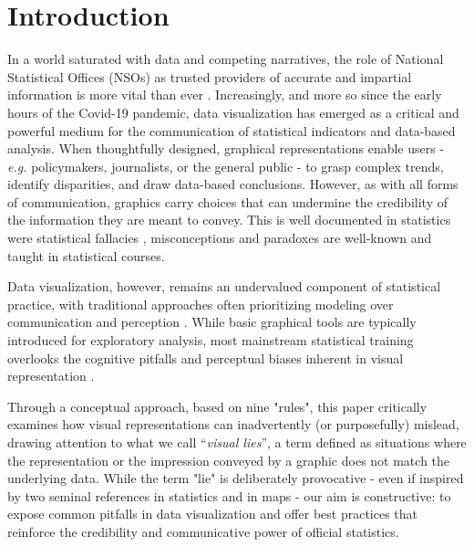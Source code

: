 \documentclass[11pt,twoside,a4paper]{article}
\begin{document}
\section{Introduction}
In a world saturated with data and competing narratives, the role of National Statistical Offices (NSOs) as trusted providers of accurate and impartial information is more vital than ever \citep{Hossein2023-DataGov, Schreyer2024-Intw, Perucci22024-Trust, Pullinger2020-Trust}. Increasingly, and more so since the early hours of the Covid-19 pandemic, data visualization has emerged as a critical and powerful medium for the communication of statistical indicators and data-based analysis. When thoughtfully designed, graphical representations enable users - \emph{ e.g.}  policymakers, journalists, or the general public - to grasp complex trends, identify disparities, and draw data-based conclusions. However, as with all forms of communication, graphics carry choices that can undermine the credibility of the information they are meant to convey. This is well documented in statistics were statistical fallacies \citep{Huff1954}, misconceptions and paradoxes \citep{blyth1973simpson} are well-known and taught in statistical courses. 

Data visualization, however, remains an undervalued component of statistical practice, with traditional approaches often prioritizing modeling over communication and perception \citep{Wickham2014}. While basic graphical tools are typically introduced for exploratory analysis, most mainstream statistical training overlooks the cognitive pitfalls and perceptual biases inherent in visual representation \citep{Cleveland1984, Cairo2019, healey2007perception}.



Through a conceptual approach, based on nine "rules", this paper critically examines how visual representations can inadvertently (or purposefully) mislead, drawing attention to what we call “\textit{visual lies}”, a term defined  \citep{Tufte2001} as situations where the representation or the impression conveyed by a graphic does not match the underlying data. While the term "lie"  is deliberately provocative - even if inspired by two seminal references in statistics \citep{Huff1954} and in maps \citep{Monmonier1991} - our aim is constructive: to expose common pitfalls in data visualization and offer best practices that reinforce the credibility and communicative power of official statistics.
\end{document}
